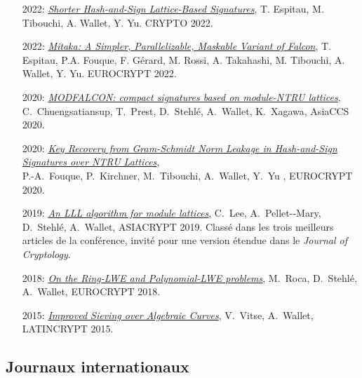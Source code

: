 \documentclass[11pt]{article}
\newcommand{\cs}{\cb{s}}
\begin{document}
\begin{itemize}
\item[2022:] \href{https://eprint.iacr.org/2019/1456}{\em Shorter Hash-and-Sign Lattice-Based Signatures}, T. Espitau, M. Tibouchi, A. Wallet, Y. Yu. CRYPTO 2022.

\item[2022:] \href{https://eprint.iacr.org/2021/1486.pdf}{\em Mitaka: A Simpler, Parallelizable, Maskable Variant of Falcon}, T. Espitau, P.A. Fouque, F. Gérard, M. Rossi, A. Takahashi, M. Tibouchi, A. Wallet, Y. Yu. EUROCRYPT 2022.
    
\item[2020:] \href{https://eprint.iacr.org/2019/1456}{\em MODFALCON: compact signatures based on module-NTRU lattices}, C.~Chuengsatiansup, T.~Prest, D.~Stehlé, A.~Wallet, K.~Xagawa, AsiaCCS 2020.
  
\item[2020:] \href{https://eprint.iacr.org/2019/1180.pdf}{\em Key Recovery from Gram-Schmidt Norm Leakage in Hash-and-Sign Signatures over NTRU Lattices},\\ P.-A.~Fouque, P.~Kirchner, M.~Tibouchi, A.~Wallet, Y.~Yu , EUROCRYPT 2020.
\item[2019:]  \href{https://eprint.iacr.org/2019/1035.pdf}{\em An LLL algorithm for module lattices}, C.~Lee, A.~Pellet-\hspace{.1pt}-Mary, D.~Stehlé, A.~Wallet, ASIACRYPT 2019.
  Classé dans les trois meilleurs articles de la conférence, invité pour une version étendue dans le {\em Journal of Cryptology}.

\item[2018:] \href{https://eprint.iacr.org/2018/170.pdf}{\em On the Ring-LWE and Polynomial-LWE problems}, M.~Ro\cs ca, D.~Stehlé, A.~Wallet, EUROCRYPT 2018.
\item[2015:] \href{http://hal.upmc.fr/hal-01203086/document}{\em Improved Sieving over Algebraic Curves}, V.~Vitse, A.~Wallet, LATINCRYPT 2015.
\end{itemize}


\subsection*{Journaux internationaux}
\end{document}
